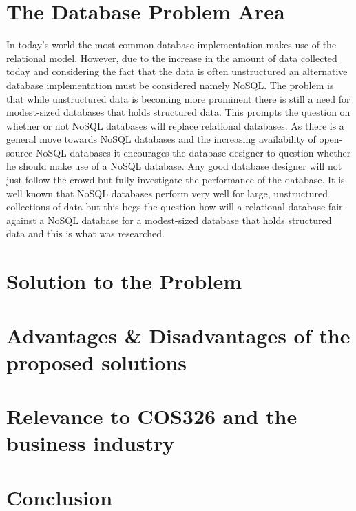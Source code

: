 \documentclass[hidelinks,english]{article}
\begin{document}
   \section{The Database Problem Area}
   In today's world the most common database implementation makes use of the relational model. However, due to the increase in the amount of data collected today and considering the fact that the data is often unstructured an alternative database implementation must be considered namely NoSQL. The problem is that while unstructured data is becoming more prominent there is still a need for modest-sized databases that holds structured data. This prompts the question on whether or not NoSQL databases will replace relational databases. As there is a general move towards NoSQL databases and the increasing availability of open-source NoSQL databases it encourages the database designer to question whether he should make use of a NoSQL database. Any good database designer will not just follow the crowd but fully investigate the performance of the database. It is well known that NoSQL databases perform very well for large, unstructured collections of data but this begs the question how will a relational database fair against a NoSQL database for a modest-sized database that holds structured data and this is what was researched.
   
   \section{Solution to the Problem}
   
   \section{Advantages & Disadvantages of the proposed solutions}
   
   \section{Relevance to COS326 and the business industry}
    
    \section{Conclusion}
	
	
	
\end{document}
